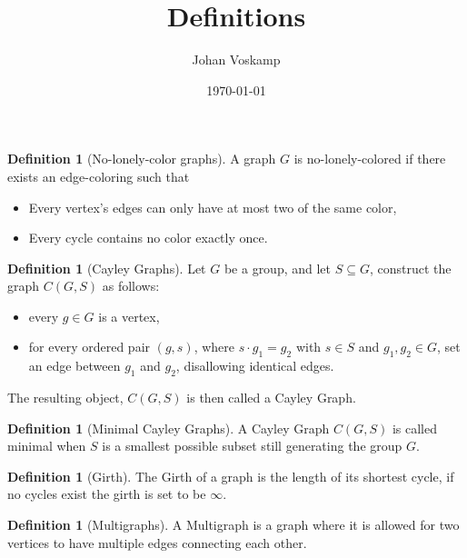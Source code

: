 \documentclass[a4paper,10pt]{article}
\title{Definitions}
\author{Johan Voskamp}
\date{\today}
\theoremstyle{plain}
\theoremstyle{definition}
\newtheorem{definition}[theorem]{Definition}
\theoremstyle{remark}
\begin{document}
    \maketitle
    
    \section{}
    
   
    
    \begin{definition}[No-lonely-color graphs]\label{lonely}
    	A graph \(G\) is no-lonely-colored if there exists an edge-coloring such that 
        \begin{itemize}
            \item Every vertex's edges can only have at most two of the same color,
            \item Every cycle contains no color exactly once.
        \end{itemize}
    \end{definition}

    \begin{definition}[Cayley Graphs]\label{cayley}
        Let \(G\) be a group, and let \(S
        \subseteq G\), construct the graph \(C(G,S)\) as follows:
        \begin{itemize}
            \item every \(g\in G\) is a vertex,
            \item for every ordered pair \((g, s)\), where \(s\cdot g_1 = g_2\) with \(s\in S\) and \(g_1, g_2\in G\), set an edge between \(g_1\) and \(g_2\), disallowing identical edges.
        \end{itemize}
        The resulting object, \(C(G,S)\) is then called a Cayley Graph.
    \end{definition}

    \begin{definition}[Minimal Cayley Graphs]\label{min-cayley}
        A Cayley Graph \(C(G,S)\) is called minimal when \(S\) is a smallest possible subset still generating the group \(G\).
    \end{definition}
    
    \begin{definition}[Girth]\label{girth}
        The Girth of a graph is the length of its shortest cycle, if no cycles exist the girth is set to be \(\infty\).
    \end{definition}
    
    \begin{definition}[Multigraphs]\label{multigraph}
        A Multigraph is a graph where it is allowed for two vertices to have multiple edges connecting each other.
    \end{definition}
\end{document}
